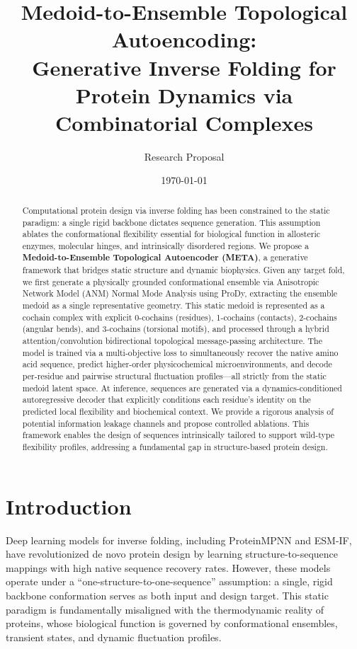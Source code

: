 \documentclass{article}
\title{\textbf{Medoid-to-Ensemble Topological Autoencoding: \\ Generative Inverse Folding for Protein Dynamics via Combinatorial Complexes}}
\author{Research Proposal}
\date{\today}
\begin{document}
\maketitle

\begin{abstract}
Computational protein design via inverse folding has been constrained to the static paradigm: a single rigid backbone dictates sequence generation. This assumption ablates the conformational flexibility essential for biological function in allosteric enzymes, molecular hinges, and intrinsically disordered regions. We propose a \textbf{Medoid-to-Ensemble Topological Autoencoder (META)}, a generative framework that bridges static structure and dynamic biophysics. Given any target fold, we first generate a physically grounded conformational ensemble via Anisotropic Network Model (ANM) Normal Mode Analysis using ProDy, extracting the ensemble medoid as a single representative geometry. This static medoid is represented as a cochain complex with explicit 0-cochains (residues), 1-cochains (contacts), 2-cochains (angular bends), and 3-cochains (torsional motifs), and processed through a hybrid attention/convolution bidirectional topological message-passing architecture. The model is trained via a multi-objective loss to simultaneously recover the native amino acid sequence, predict higher-order physicochemical microenvironments, and decode per-residue and pairwise structural fluctuation profiles---all strictly from the static medoid latent space. At inference, sequences are generated via a dynamics-conditioned autoregressive decoder that explicitly conditions each residue's identity on the predicted local flexibility and biochemical context. We provide a rigorous analysis of potential information leakage channels and propose controlled ablations. This framework enables the design of sequences intrinsically tailored to support wild-type flexibility profiles, addressing a fundamental gap in structure-based protein design.
\end{abstract}

\section{Introduction}

Deep learning models for inverse folding, including ProteinMPNN and ESM-IF, have revolutionized de novo protein design by learning structure-to-sequence mappings with high native sequence recovery rates. However, these models operate under a ``one-structure-to-one-sequence'' assumption: a single, rigid backbone conformation serves as both input and design target. This static paradigm is fundamentally misaligned with the thermodynamic reality of proteins, whose biological function is governed by conformational ensembles, transient states, and dynamic fluctuation profiles.
\end{document}
